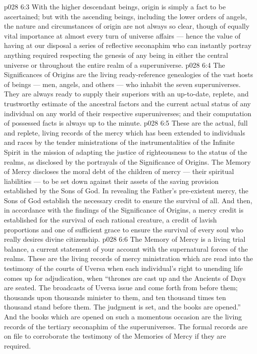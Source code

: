 \vs p028 6:3 With the higher descendant beings, origin is simply a fact to be ascertained; but with the ascending beings, including the lower orders of angels, the nature and circumstances of origin are not always so clear, though of equally vital importance at almost every turn of universe affairs --- hence the value of having at our disposal a series of reflective seconaphim who can instantly portray anything required respecting the genesis of any being in either the central universe or throughout the entire realm of a superuniverse.
\vs p028 6:4 The Significances of Origins are the living ready\hyp{}reference genealogies of the vast hosts of beings --- men, angels, and others --- who inhabit the seven superuniverses. They are always ready to supply their superiors with an up\hyp{}to\hyp{}date, replete, and trustworthy estimate of the ancestral factors and the current actual status of any individual on any world of their respective superuniverses; and their computation of possessed facts is always up to the minute.
\vs p028 6:5 \bibnobreakspace {} These are the actual, full and replete, living records of the mercy which has been extended to individuals and races by the tender ministrations of the instrumentalities of the Infinite Spirit in the mission of adapting the justice of righteousness to the status of the realms, as disclosed by the portrayals of the Significance of Origins. The Memory of Mercy discloses the moral debt of the children of mercy --- their spiritual liabilities --- to be set down against their assets of the saving provision established by the Sons of God. In revealing the Father’s pre\hyp{}existent mercy, the Sons of God establish the necessary credit to ensure the survival of all. And then, in accordance with the findings of the Significance of Origins, a mercy credit is established for the survival of each rational creature, a credit of lavish proportions and one of sufficient grace to ensure the survival of every soul who really desires divine citizenship.
\vs p028 6:6 The Memory of Mercy is a living trial balance, a current statement of your account with the supernatural forces of the realms. These are the living records of mercy ministration which are read into the testimony of the courts of Uversa when each individual’s right to unending life comes up for adjudication, when “thrones are cast up and the Ancients of Days are seated. The broadcasts of Uversa issue and come forth from before them; thousands upon thousands minister to them, and ten thousand times ten thousand stand before them. The judgment is set, and the books are opened.” And the books which are opened on such a momentous occasion are the living records of the tertiary seconaphim of the superuniverses. The formal records are on file to corroborate the testimony of the Memories of Mercy if they are required.

